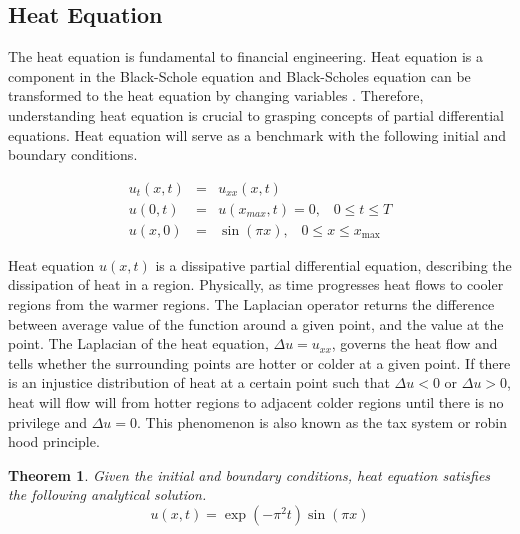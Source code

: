 \documentclass[12pt, oneside]{book}
\theoremstyle{plain}
\newtheorem{theorem}{Theorem}[section]
\theoremstyle{definition}
\begin{document}
\subsection{Heat Equation}
The heat equation is fundamental to financial engineering. Heat equation is a component in the Black-Schole equation and Black-Scholes equation can be transformed to the heat equation by changing variables \cite{capinski}. Therefore, understanding heat equation is crucial to grasping concepts of partial differential equations. Heat equation will serve as a benchmark with the following initial and boundary conditions.

\begin{eqnarray} \label{HeatBase}
u_t(x,t) &=& u_{xx}(x, t) \\[10pt]
u(0, t) &=& u(x_{max}, t) = 0, \hspace{10pt} 0 \leq t \leq T \\[10pt]
u(x, 0) &=& \sin(\pi x), \hspace{10pt} 0 \leq x \leq x_{\max}
\end{eqnarray}

Heat equation $u(x, t)$ is a dissipative partial differential equation, describing the dissipation of heat in a region. Physically, as time progresses heat flows to cooler regions from the warmer regions. The Laplacian operator returns the difference between average value of the function around a given point, and the value at the point. The Laplacian of the heat equation, $\Delta u = u_{xx}$, governs the heat flow and tells whether the surrounding points are hotter or colder at a given point. If there is an injustice distribution of heat at a certain point such that  $\Delta u < 0 $ or  $\Delta u > 0$, heat will flow will from hotter regions to adjacent colder regions until there is no privilege and $\Delta u = 0 $. This phenomenon is also known as the tax system or robin hood principle.

\begin{theorem} \label{heatAnal}
Given the initial and boundary conditions, heat equation satisfies the following analytical solution.
\begin{equation}
u(x, t) = \exp(-\pi^2 t) \sin(\pi x)
\end{equation}
\end{theorem}  
\end{document}
